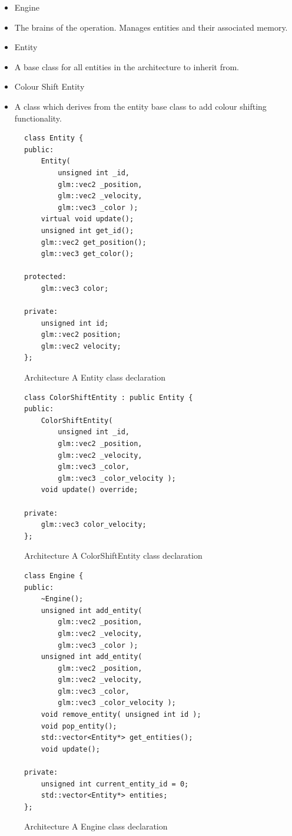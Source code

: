 \documentclass{article}
\begin{document}
\begin{itemize}
    \item Engine
    \item[] The brains of the operation. Manages entities and their associated
            memory.

    \item Entity
    \item[] A base class for all entities in the architecture to inherit from.

    \item Colour Shift Entity
    \item[] A class which derives from the entity base class to add colour
            shifting functionality. 
\end{itemize}

\begin{figure}
\centering
\begin{BVerbatim}
class Entity {
public:
    Entity(
        unsigned int _id,
        glm::vec2 _position,
        glm::vec2 _velocity,
        glm::vec3 _color );
    virtual void update();
    unsigned int get_id();
    glm::vec2 get_position();
    glm::vec3 get_color();

protected:
    glm::vec3 color;

private:
    unsigned int id;
    glm::vec2 position;
    glm::vec2 velocity;
};
\end{BVerbatim}
\caption{Architecture A Entity class declaration}
\label{arch_a_entity_header}
\end{figure}

\begin{figure}
\centering
\begin{BVerbatim}
class ColorShiftEntity : public Entity {
public:
    ColorShiftEntity(
        unsigned int _id,
        glm::vec2 _position,
        glm::vec2 _velocity,
        glm::vec3 _color,
        glm::vec3 _color_velocity );
    void update() override;

private:
    glm::vec3 color_velocity;
};
\end{BVerbatim}
\caption{Architecture A ColorShiftEntity class declaration}
\label{arch_a_color_shift_entity_header}
\end{figure}

\begin{figure}
\centering
\begin{BVerbatim}
class Engine {
public:
    ~Engine();
    unsigned int add_entity(
        glm::vec2 _position,
        glm::vec2 _velocity,
        glm::vec3 _color );
    unsigned int add_entity(
        glm::vec2 _position,
        glm::vec2 _velocity,
        glm::vec3 _color,
        glm::vec3 _color_velocity );
    void remove_entity( unsigned int id );
    void pop_entity();
    std::vector<Entity*> get_entities();
    void update();

private:
    unsigned int current_entity_id = 0;
    std::vector<Entity*> entities;
};
\end{BVerbatim}
\caption{Architecture A Engine class declaration}
\label{arch_a_engine_header}
\end{figure}
\end{document}
